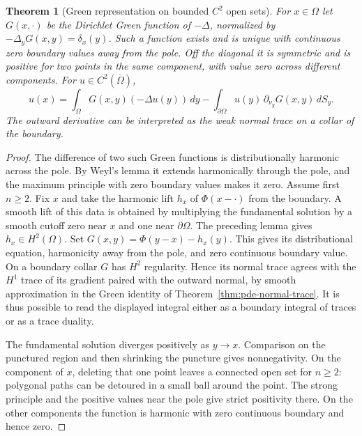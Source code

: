 \documentclass[11pt,oneside,openany]{book}
\theoremstyle{plain}
\newtheorem{theorem}{Theorem}[chapter]
\theoremstyle{definition}
\theoremstyle{remark}
\begin{document}
\begin{theorem}[Green representation on bounded \(C^2\) open sets]
\label{thm:pde-green-representation}
For \(x\in\Omega\) let \(G(x,\cdot)\) be the Dirichlet Green
function of \(-\Delta\), normalized by
\(-\Delta_y G(x,y)=\delta_x(y)\). Such a function exists and is
unique with continuous zero boundary values away from the pole.
Off the diagonal it is symmetric and is positive for two
points in the same component, with value zero across
different components. For \(u\in C^2(\overline\Omega)\),
\[
 u(x)=\int_\Omega G(x,y)(-\Delta u(y))\,dy
       -\int_{\partial\Omega}u(y)\,\partial_{\nu_y}G(x,y)\,dS_y.
\]
The outward derivative can be interpreted as the weak normal
trace on a collar of the boundary.
\end{theorem}
\begin{proof}
The difference of two such Green functions is distributionally
harmonic across the pole. By Weyl's lemma it extends harmonically
through the pole, and the maximum principle with zero boundary
values makes it zero.
Assume first \(n\ge2\).
Fix \(x\) and take the harmonic lift \(h_x\) of
\(\Phi(x-\cdot)\) from the boundary. A smooth lift
of this data is obtained by multiplying the fundamental
solution by a smooth cutoff zero near \(x\) and one
near \(\partial\Omega\). The preceding lemma gives
\(h_x\in H^2(\Omega)\). Set
\(G(x,y)=\Phi(y-x)-h_x(y)\).
This gives its distributional equation, harmonicity away
from the pole, and zero continuous boundary value.
On a boundary collar \(G\) has \(H^2\) regularity. Hence
its normal trace agrees with the \(H^1\) trace of its
gradient paired with the outward normal, by smooth
approximation in the Green identity of
Theorem~\ref{thm:pde-normal-trace}. It is thus possible
to read the displayed integral either as a boundary
integral of traces or as a trace duality.

The fundamental solution diverges positively as \(y\to x\).
Comparison on the punctured region and then shrinking
the puncture gives nonnegativity. On the component of
\(x\), deleting that one point leaves a connected open
set for \(n\ge2\): polygonal paths can be detoured in a
small ball around the point. The strong principle and
the positive values near the pole give strict positivity
there. On the other components the function is harmonic
with zero continuous boundary and hence zero.


\end{proof}
\end{document}
